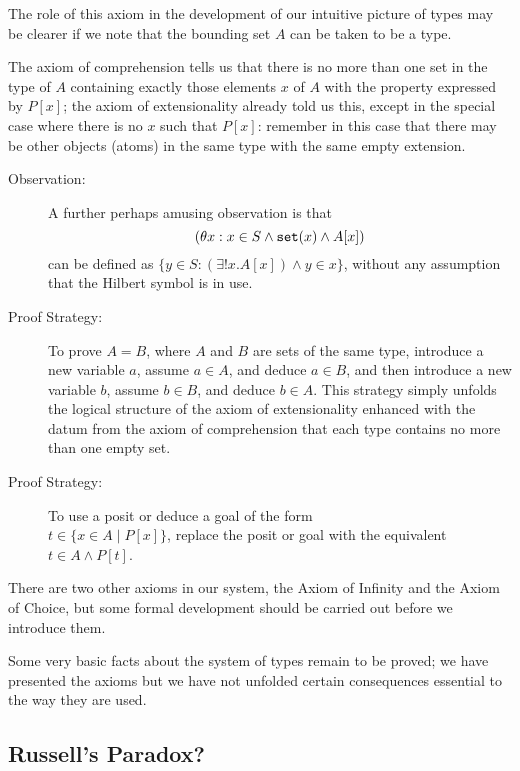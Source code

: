 \documentclass[12pt]{book}
\begin{document}
The role of this axiom in the development of our intuitive picture of types may be clearer if we note that the bounding set $A$ can be taken to be a type.

The axiom of comprehension tells us that there is no more than one set in the type of $A$  containing exactly those elements $x$ of $A$ with the property expressed by $P[x]$;  the axiom of extensionality already told us this, except in the special case where there is no $x$ such that $P[x]$:  remember in this case that there may be other objects (atoms) in the same type with the same empty extension.

\begin{description}

\item[Observation:]  A further perhaps amusing observation is that $$(\theta x:x \in S \wedge {\tt set}(x) \wedge A[x])$$ can be defined as $\{y \in S:(\exists!x.A[x]) \wedge y \in x\}$, without any assumption that the Hilbert symbol is in use.

\item[Proof Strategy:] To prove $A=B$, where $A$ and $B$ are sets of the same type,
introduce a new variable $a$, assume $a \in A$, and deduce $a \in B$,
and then introduce a new variable $b$, assume $b \in B$, and deduce $b
\in A$.  This strategy simply unfolds the logical structure of the
axiom of extensionality enhanced with the datum from the axiom of comprehension that each type contains no more than one empty set.


\item[Proof Strategy:] To use a posit or deduce a goal of the form \\  $t
\in \{x \in A \mid P[x]\}$, replace the posit or goal with the equivalent
$t \in A \wedge P[t]$.

\end{description}

There are two other axioms in our system, the Axiom of Infinity and
the Axiom of Choice, but some formal development should be carried out
before we introduce them.

Some very basic facts about the system of types remain to be proved;  we have presented the axioms but we have not unfolded certain consequences essential to the way they are used.

\newpage

\subsection{Russell's Paradox?}
\end{document}
